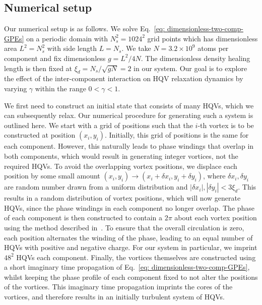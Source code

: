 \subsection{Numerical setup}\label{subsec: two-comp-numerical-setup}
Our numerical setup is as follows.
We solve Eq.~\eqref{eq: dimensionless-two-comp-GPEs} on a periodic domain with
\(N_s^2=1024^2\) grid points which has dimensionless area \(L^2=N_s^2\) with
side length \(L=N_s\).
We take \(N=3.2\times10^9\) atoms per component and fix dimensionless
\(g=L^2/4N\).
The dimensionless density healing length is then fixed at
\(\xi_d=N_s/\sqrt{gN}=2\) in our system.
Our goal is to explore the effect of the inter-component interaction on HQV
relaxation dynamics by varying \(\gamma \) within the range \(0 < \gamma < 1\).

We first need to construct an initial state that consists of many HQVs, which we
can subsequently relax.
Our numerical procedure for generating such a system is outlined here.
We start with a grid of positions such that the \(i\)-th vortex is to be
constructed at position \((x_i, y_i)\).
Initially, this grid of positions is the same for each component.
However, this naturally leads to phase windings that overlap in both components,
which would result in generating integer vortices, not the required HQVs.
To avoid the overlapping vortex positions, we displace each position by some
small amount \((x_i, y_i) \rightarrow (x_i + \delta x_i, y_i + \delta y_i)\),
where \(\delta x_i, \delta y_i\) are random number drawn from a uniform
distribution and \(|\delta x_i|, |\delta y_i| < 3\xi_d\).
This results in a random distribution of vortex positions, which will now
generate HQVs, since the phase windings in each component no longer overlap.
The phase of each component is then constructed to contain a \( 2\pi \) about
each vortex position using the method described in~\cite{Billam2014}.
To ensure that the overall circulation is zero, each position alternates the
winding of the phase, leading to an equal number of HQVs with positive and
negative charge.
For our system in particular, we imprint \(48^2\) HQVs each component.
Finally, the vortices themselves are constructed using a short imaginary time
propagation of Eq.~\eqref{eq: dimensionless-two-comp-GPEs}, whilst keeping the
phase profile of each component fixed to not alter the positions of the
vortices.
This imaginary time propagation imprints the cores of the vortices, and
therefore results in an initially turbulent system of HQVs.


